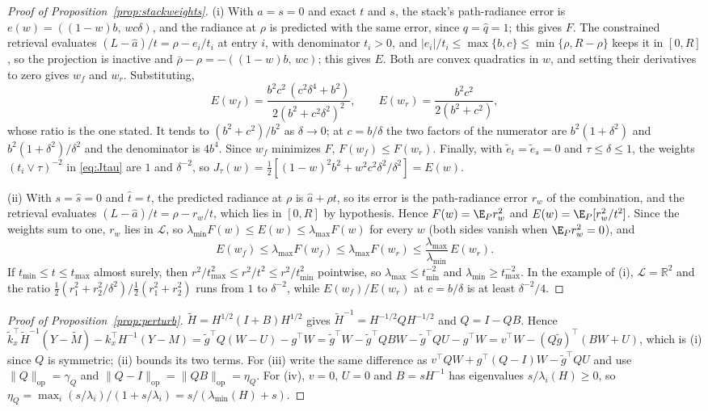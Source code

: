 \begin{proof}[Proof of Proposition~\ref{prop:stackweights}]
(i) With $a=s=0$ and exact $t$ and $s$, the stack's path-radiance error is
$e(w)=((1-w)b,\,wc\delta)$, and the radiance at $\rho$ is predicted with the same error, since
$q=\widehat q=1$; this gives $F$. The constrained retrieval evaluates
$(L-\widehat a)/t=\rho-e_i/t_i$ at entry $i$, with denominator $t_i>0$, and
$|e_i|/t_i\le\max\{b,c\}\le\min\{\rho,R-\rho\}$ keeps it in $[0,R]$, so the projection is inactive
and $\bar\rho-\rho=-((1-w)b,\,wc)$; this gives $E$. Both are convex quadratics in $w$, and setting
their derivatives to zero gives $w_f$ and $w_r$. Substituting,
\[
E(w_f)=\frac{b^2c^2\,(c^2\delta^4+b^2)}{2(b^2+c^2\delta^2)^2},\qquad
E(w_r)=\frac{b^2c^2}{2(b^2+c^2)},
\]
whose ratio is the one stated. It tends to $(b^2+c^2)/b^2$ as $\delta\to0$; at $c=b/\delta$ the
two factors of the numerator are $b^2(1+\delta^2)$ and $b^2(1+\delta^2)/\delta^2$ and the
denominator is $4b^4$. Since $w_f$ minimizes $F$, $F(w_f)\le F(w_r)$. Finally, with
$\widetilde e_t=\widetilde e_s=0$ and $\tau\le\delta\le1$, the weights $(t_i\vee\tau)^{-2}$ in
\eqref{eq:Jtau} are $1$ and $\delta^{-2}$, so $J_\tau(w)=\tfrac12[(1-w)^2b^2+w^2c^2\delta^2/\delta^2]=E(w)$.

(ii) With $s=\widehat s=0$ and $\widehat t=t$, the predicted radiance at $\rho$ is
$\widehat a+\rho t$, so its error is the path-radiance error $r_w$ of the combination, and the
retrieval evaluates $(L-\widehat a)/t=\rho-r_w/t$, which lies in $[0,R]$ by hypothesis. Hence
$F(w)=\E_Pr_w^2$ and $E(w)=\E_P[r_w^2/t^2]$. Since the weights sum to one, $r_w$ lies in
$\mathcal L$, so $\lambda_{\min}F(w)\le E(w)\le\lambda_{\max}F(w)$ for every $w$ (both sides vanish
when $\E_Pr_w^2=0$), and
\[
E(w_f)\le\lambda_{\max}F(w_f)\le\lambda_{\max}F(w_r)\le\frac{\lambda_{\max}}{\lambda_{\min}}\,E(w_r).
\]
If $t_{\min}\le t\le t_{\max}$ almost surely, then
$r^2/t_{\max}^2\le r^2/t^2\le r^2/t_{\min}^2$ pointwise, so $\lambda_{\max}\le t_{\min}^{-2}$ and
$\lambda_{\min}\ge t_{\max}^{-2}$. In the example of (i), $\mathcal L=\mathbb R^2$ and the ratio
$\tfrac12(r_1^2+r_2^2/\delta^2)/\tfrac12(r_1^2+r_2^2)$ runs from $1$ to $\delta^{-2}$, while
$E(w_f)/E(w_r)$ at $c=b/\delta$ is at least $\delta^{-2}/4$.
\end{proof}

\begin{proof}[Proof of Proposition~\ref{prop:perturb}]
$\widetilde H=H^{1/2}(I+B)H^{1/2}$ gives $\widetilde H^{-1}=H^{-1/2}QH^{-1/2}$ and $Q=I-QB$. Hence
$\widetilde k_x^{\top}\widetilde H^{-1}(Y-\widetilde M)-k_x^{\top}H^{-1}(Y-M)
=\widetilde g^{\top}Q(W-U)-g^{\top}W
=\widetilde g^{\top}W-\widetilde g^{\top}QBW-\widetilde g^{\top}QU-g^{\top}W
=v^{\top}W-(Q\widetilde g)^{\top}(BW+U)$, which is (i) since $Q$ is symmetric; (ii) bounds its two terms. For (iii)
write the same difference as $v^{\top}QW+g^{\top}(Q-I)W-\widetilde g^{\top}QU$ and use
$\|Q\|_{\mathrm{op}}=\gamma_Q$ and $\|Q-I\|_{\mathrm{op}}=\|QB\|_{\mathrm{op}}=\eta_Q$. For (iv), $v=0$, $U=0$ and
$B=sH^{-1}$ has eigenvalues $s/\lambda_i(H)\ge0$, so $\eta_Q=\max_i(s/\lambda_i)/(1+s/\lambda_i)=s/(\lambda_{\min}(H)+s)$.
\end{proof}

